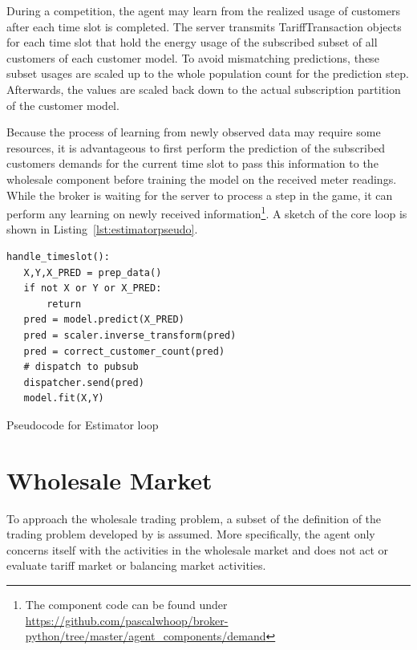 During a competition, the agent may learn from the realized usage of
customers after each time slot is completed. The server transmits TariffTransaction objects for each time slot that hold
the energy usage of the subscribed subset of all customers of each customer model. To avoid mismatching predictions,
these subset usages are scaled up to the whole population count for the prediction step. Afterwards, the values are
scaled back down to the actual subscription partition of the customer model.  

Because the process of learning from newly observed data may require some resources, it is advantageous to
first perform the prediction of the subscribed customers demands for the current time slot to pass this information to
the wholesale component before training the model on the received meter readings. While the broker is waiting for the
server to process a step in the game, it can perform any learning on newly received information\footnote{The component code can be
found under \url{https://github.com/pascalwhoop/broker-python/tree/master/agent_components/demand}}. A sketch of the
core loop is shown in Listing~\ref{lst:estimatorpseudo}.

\begin{listing}
   \begin{verbatim}
handle_timeslot():
   X,Y,X_PRED = prep_data()
   if not X or Y or X_PRED:
       return
   pred = model.predict(X_PRED)
   pred = scaler.inverse_transform(pred)
   pred = correct_customer_count(pred)
   # dispatch to pubsub
   dispatcher.send(pred)
   model.fit(X,Y)
   \end{verbatim}
    \caption{Pseudocode for Estimator loop}
    \label{lst:estimatorpseudo}
\end{listing}




\section{Wholesale Market}
\label{sec:wholesale_market}

To approach the wholesale trading problem, a subset of the definition of the trading problem developed by
\citet{tactexurieli2016mdp} is assumed. More specifically, the agent only concerns itself with the activities in the
wholesale market and does not act or evaluate tariff market or balancing market activities.

